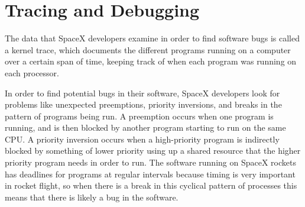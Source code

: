 \documentclass{hmcclinic}
\begin{document}
\section{Tracing and Debugging}
The data that SpaceX developers examine in order to find software bugs is called a kernel trace, which documents the different programs running on a computer over a certain span of time, keeping track of when each program was running on each processor. 

In order to find potential bugs in their software, SpaceX developers look for problems like unexpected preemptions, priority inversions, and breaks in the pattern of programs being run. A preemption occurs when one program is running, and is then blocked by another program starting to run on the same CPU. A priority inversion occurs when a high-priority program is indirectly blocked by something of lower priority using up a shared resource that the higher priority program needs in order to run. The software running on SpaceX rockets has deadlines for programs at regular intervals because timing is very important in rocket flight, so when there is a break in this cyclical pattern of processes this means that there is likely a bug in the software.
\end{document}
